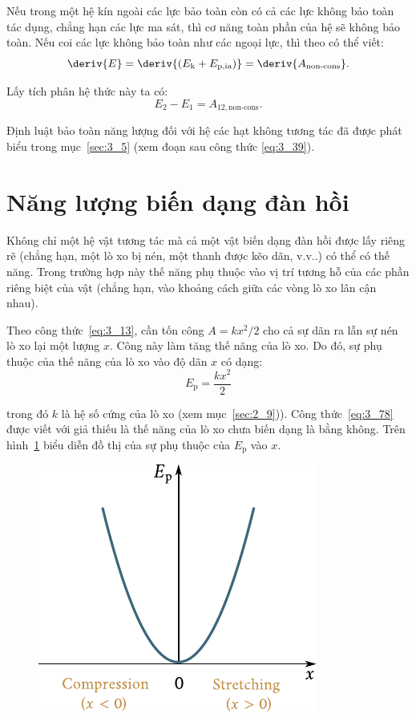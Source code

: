 Nếu trong một hệ kín ngoài các lực bảo toàn còn có cả các lực không bảo toàn tác dụng, chẳng hạn các lực ma sát, thì cơ năng toàn phần của hệ sẽ không bảo toàn. Nếu coi các lực không bảo toàn như các ngoại lực, thì theo  có thể viết: 
\begin{equation}\label{eq:3_76}
\deriv{E} = \deriv{(E_{\text{k}} + E_{\text{p,ia}})} = \deriv{A_{\text{non-cons}}}.
\end{equation}

\noindent
Lấy tích phân hệ thức này ta có: 
\begin{equation}\label{eq:3_77}
E_2 - E_1 = A_{12,\text{non-cons}}.
\end{equation}

Định luật bảo toàn năng lượng đối với hệ các hạt không tương tác đã được phát biểu trong mục~\ref{sec:3_5} (xem đoạn sau công thức \eqref{eq:3_39}).

\section{Năng lượng biến dạng đàn hồi}\label{sec:3_8}

Không chỉ một hệ vật tương tác mà cả một vật biến dạng đàn hồi được lấy riêng rẽ (chẳng hạn, một lò xo bị nén, một thanh được kẽo dãn, v.v..) có thể có thế năng. Trong trường hợp này thế năng phụ thuộc vào vị trí tương hỗ của các phần riêng biệt của vật (chẳng hạn, vào khoảng cách giữa các vòng lò xo lân cận nhau).

Theo công thức~\eqref{eq:3_13}, cần tốn công $A=kx^2/2$ cho cả sự dãn ra lẫn sự nén lò xo lại một lượng $x$. Công này làm tăng thế năng của lò xo. Do đó, sự phụ thuộc của thế năng của lò xo vào độ dãn $x$ có dạng:
\begin{equation}\label{eq:3_78}
E_{\text{p}} = \frac{kx^2}{2}
\end{equation}

\noindent
trong đó $k$ là hệ số cứng của lò xo (xem mục~\ref{sec:2_9})). Công thức~\eqref{eq:3_78} được viết với giả thiếu là thế năng của lò xo chưa biến dạng là bằng không. Trên hình~\ref{fig:3_13} biểu diễn đồ thị của sự phụ thuộc của $E_{\text{p}}$ vào $x$. 

\begin{figure}[!htb]
	\begin{center}
		\includegraphics[scale=1]{figures/ch_03/fig_3_13.pdf}
		\caption[]{}
		\label{fig:3_13}
	\end{center}
\end{figure}

